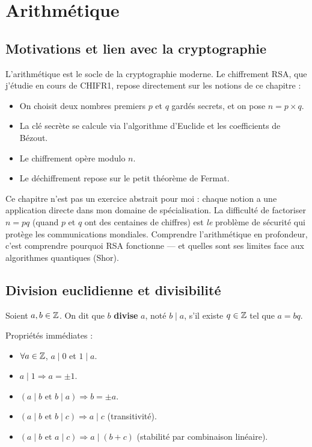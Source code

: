 \chapter{Arithmétique}

\section{Motivations et lien avec la cryptographie}

L'arithmétique est le socle de la cryptographie moderne. Le chiffrement RSA, que j'étudie en cours de CHIFR1, repose directement sur les notions de ce chapitre :
\begin{itemize}[leftmargin=1cm]
  \item On choisit deux nombres premiers $p$ et $q$ gardés secrets, et on pose $n = p \times q$.
  \item La clé secrète se calcule via l'algorithme d'Euclide et les coefficients de Bézout.
  \item Le chiffrement opère modulo $n$.
  \item Le déchiffrement repose sur le petit théorème de Fermat.
\end{itemize}

\begin{intuitionbox}[Arithmétique = fondation de la cybersécurité]
Ce chapitre n'est pas un exercice abstrait pour moi : chaque notion a une application directe dans mon domaine de spécialisation. La difficulté de factoriser $n = pq$ (quand $p$ et $q$ ont des centaines de chiffres) est \emph{le} problème de sécurité qui protège les communications mondiales. Comprendre l'arithmétique en profondeur, c'est comprendre pourquoi RSA fonctionne --- et quelles sont ses limites face aux algorithmes quantiques (Shor).
\end{intuitionbox}


\section{Division euclidienne et divisibilité}

\begin{defbox}[--- Divisibilité]
Soient $a, b \in \mathbb{Z}$. On dit que $b$ \textbf{divise} $a$, noté $b \mid a$, s'il existe $q \in \mathbb{Z}$ tel que $a = bq$.

\medskip
Propriétés immédiates :
\begin{itemize}[leftmargin=1cm]
  \item $\forall a \in \mathbb{Z}$, $a \mid 0$ et $1 \mid a$.
  \item $a \mid 1 \Rightarrow a = \pm 1$.
  \item $(a \mid b \text{ et } b \mid a) \Rightarrow b = \pm a$.
  \item $(a \mid b \text{ et } b \mid c) \Rightarrow a \mid c$ \quad (transitivité).
  \item $(a \mid b \text{ et } a \mid c) \Rightarrow a \mid (b + c)$ \quad (stabilité par combinaison linéaire).
\end{itemize}
\end{defbox}

